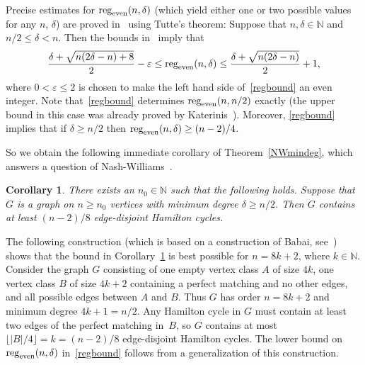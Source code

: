 \documentclass{memo-l}
\newtheorem{cor}[firstthm]{Corollary}
\def\COMMENT#1{}
\def\eps{\varepsilon}
\numberwithin{section}{chapter}
\numberwithin{equation}{section}
\numberwithin{firstthm}{section}
\numberwithin{figure}{section}
\begin{document}
Precise estimates for ${\rm reg}_{\rm even}(n,\delta)$ 
(which yield either one or two possible values for any $n$, $\delta$)
are proved in~\cite{CKO,Hartkefactors} using Tutte's theorem:
Suppose that $n,\delta\in\mathbb{N}$ and $n/2\le\delta<n$.
Then the bounds in~\cite{Hartkefactors} imply that
\begin{equation} \label{regbound}
\frac{\delta+\sqrt{n(2\delta-n)+8}}{2}-\eps\le\textnormal{reg}_{\textnormal{even}}(n,\delta)
\le\frac{\delta+\sqrt{n(2\delta-n)}}{2}+1, %
\end{equation}
where $0<\eps  \le 2$ is chosen to make the left hand side of~\eqref{regbound} an even
integer. Note that~\eqref{regbound} determines $\textnormal{reg}_{\textnormal{even}}(n,n/2)$
exactly (the upper bound in this case was already proved by Katerinis~\cite{Katerinis}).
Moreover, \eqref{regbound} implies that if $\delta \geq n/2$ then ${\rm reg}_{\rm even}(n,\delta) \ge (n-2)/4$.%
%
\COMMENT{let $r$ be the lower bound in~\ref{regbound}. 
for $n$ odd, there is room to spare, as then $\delta>n/2$ and so $r \ge n/4+\Omega(\sqrt{n})$.
For $n=8k$, we have $\delta=4k$ and so their formula gives $r = 2k+\sqrt{2}-\eps=2k=n/4$.
For $n=8k+2$, we have $\delta=4k+1$ and so $r = 2k+1/2+\sqrt{2}-\eps=2k=(n-2)/4$.
For  $n=8k+4$, we have $\delta=4k+2$ and so $r = 2k+1+\sqrt{2}-\eps=2k+2=(n+4)/4$.
For $n=8k+6$, we have $\delta=4k+3$ and so $r = 2k+3/2+\sqrt{2}-\eps=2k+2=(n+2)/4$.}
%
So we obtain the following immediate corollary of Theorem~\ref{NWmindeg}, 
which answers a question of Nash-Williams~\cite{initconj,Diracext,decompconj}.
\begin{cor}\label{NWmindegcor}
There exists an $n_0 \in \mathbb N$ such that the following holds. Suppose that $G$ is a graph on $n\ge n_0$ vertices with
minimum degree $\delta\ge n/2$. Then $G$ contains at least $(n-2)/8$ edge-disjoint Hamilton cycles.
\end{cor}
The following construction (which is based on a construction of Babai, see~\cite{initconj}) shows that the bound in 
Corollary~\ref{NWmindegcor} is best possible for $n=8k+2$, where $k \in \mathbb{N}$. 
Consider the graph $G$ consisting of one empty
vertex class $A$ of size $4k$, one vertex class $B$ of size $4k+2$ containing
a perfect matching and no other edges, and all possible edges between $A$ and $B$.
Thus $G$ has order $n=8k+2$ and minimum degree $4k+1=n/2$. 
Any Hamilton cycle in $G$ must contain at least two edges of
the perfect matching in~$B$, so $G$ contains at most $\lfloor |B|/4 \rfloor =k=(n-2)/8$ edge-disjoint
Hamilton cycles. The lower bound on ${\rm reg}_{\rm even}(n,\delta)$ 
in~\eqref{regbound} follows from a generalization of this construction.
\end{document}

